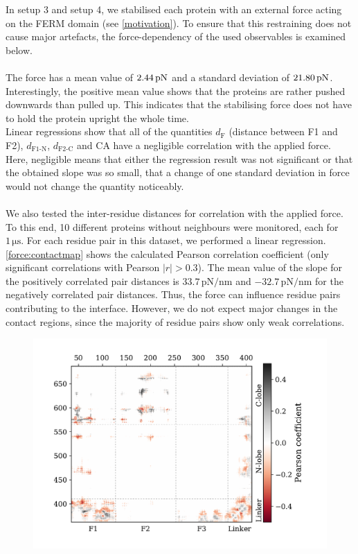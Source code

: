\label{forceana}
In setup 3 and setup 4, we stabilised each protein with an external force acting on the FERM domain (see \autoref{motivation}). To ensure that this restraining does not cause major artefacts, the force-dependency of the used observables is examined below.\\
\\
The force has a mean value of $2.44\,\forceunit$ and a standard deviation of $21.80\,\forceunit$. Interestingly, the positive mean value shows that the proteins are rather pushed downwards than pulled up. This indicates that the stabilising force does not have to hold the protein upright the whole time. %
\\
Linear regressions show that all of the quantities $d_\text{F}$ (distance between F1 and F2), $d_\text{F1-N}$, $d_\text{F2-C}$ and CA have a negligible correlation with the applied force. Here, negligible means that either the regression result was not significant or that the obtained slope was so small, that a change of one standard deviation in force would not change the quantity noticeably.\\
\\
We also tested the inter-residue distances for correlation with the applied force. To this end, 10 different proteins without neighbours were monitored, each for $1\,\si{\micro\second}$. For each residue pair in this dataset, we performed a linear regression. \autoref{force:contactmap} shows the calculated Pearson correlation coefficient (only significant correlations with Pearson $\left|r\right| > 0.3$). The mean value of the slope for the positively correlated pair distances is $33.7\,\si{\pico\newton/\nano\metre}$ and $-32.7\,\si{\pico\newton/\nano\metre}$ for the negatively correlated pair distances. Thus, the force can influence residue pairs contributing to the interface. However, we do not expect major changes in the contact regions, since the majority of residue pairs show only weak correlations.\\
%
%
%
\begin{figure}[h]
	\centering
	\includegraphics[width=.7\textwidth]{figures/results/interface_corr}
	\label{force:contactmap}
\end{figure}
